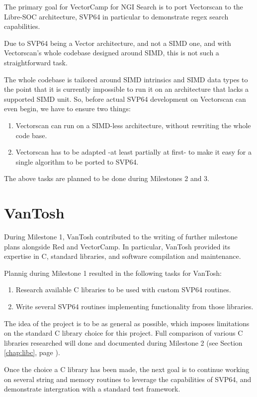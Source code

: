 The primary goal for VectorCamp for NGI Search is to port
Vectorscan to the Libre-SOC architecture, SVP64 in particular to demonstrate
regex search capabilities.

Due to SVP64 being a Vector architecture,
and not a SIMD one, and with Vectorscan’s whole codebase designed around SIMD,
this is not such a straightforward task.

The whole codebase is tailored around SIMD intrinsics and SIMD data types to
the point that it is currently impossible to run it on an architecture that
lacks a supported SIMD unit. So, before actual SVP64 development on Vectorscan
can even begin, we have to ensure two things:

\begin{enumerate}
  \item Vectorscan can run on a SIMD-less architecture, without rewriting
   the whole code base.
  \item Vectorscan has to be adapted -at least partially at first- to make it easy
   for a single algorithm to be ported to SVP64.
\end{enumerate}

The above tasks are planned to be done during Milestones 2 and 3.

\section{VanTosh}

During Milestone 1, VanTosh contributed to the writing of further
milestone plans alongside Red and VectorCamp. In particular, VanTosh
provided its expertise in C, standard libraries, and software compilation and
maintenance.

Plannig during Milestone 1 resulted in the following tasks for VanTosh:

\begin{enumerate}
  \item Research available C libraries to be used with custom SVP64 routines.
  \item Write several SVP64 routines implementing functionality from those libraries.
\end{enumerate}

The idea of the project is to be as general as possible, which imposes limitations
on the standard C library choice for this project. Full comparison of various
C libraries researched will done and documented during Milestone 2
(see Section \ref{chap:libc}, page \pageref{chap:libc}).

Once the choice a C library has been made, the next goal is to continue working on
several string and memory routines to leverage the capabilities of SVP64,
and demonstrate intergration with a standard test framework.

